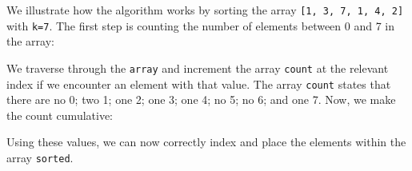\documentclass[a4paper, openany]{memoir}
\begin{document}
\noindent We illustrate how the algorithm works by sorting the array \texttt{[1, 3, 7, 1, 4, 2]} with \texttt{k=7}. The first step is counting the number of elements between 0 and 7 in the array:
\begin{center}
\end{center}
We traverse through the \texttt{array} and increment the array \texttt{count} at the relevant index if we encounter an element with that value. The array \texttt{count} states that there are no 0; two 1; one 2; one 3; one 4; no 5; no 6; and one 7. Now, we make the count cumulative:
\begin{center}
\end{center}
Using these values, we can now correctly index and place the elements within the array \texttt{sorted}.
\end{document}
